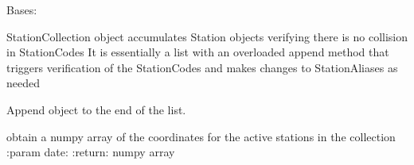 \documentclass[letterpaper,10pt,english]{sphinxmanual}
\begin{document}

\begin{fulllineitems}
\label{\detokenize{parallel_gamit:parallel_gamit.pyStation.StationCollection}}
\pysigstartsignatures
{}
\pysigstopsignatures
\sphinxAtStartPar
Bases: 

\sphinxAtStartPar
StationCollection object accumulates Station objects verifying there is no collision in StationCodes
It is essentially a list with an overloaded append method that triggers verification of the StationCodes and
makes changes to StationAliases as needed

\begin{fulllineitems}
\label{\detokenize{parallel_gamit:parallel_gamit.pyStation.StationCollection.append}}
\pysigstartsignatures
{}
\pysigstopsignatures
\sphinxAtStartPar
Append object to the end of the list.

\end{fulllineitems}


\begin{fulllineitems}
\label{\detokenize{parallel_gamit:parallel_gamit.pyStation.StationCollection.compare_aliases}}
\pysigstartsignatures
{}
\pysigstopsignatures
\end{fulllineitems}


\begin{fulllineitems}
\label{\detokenize{parallel_gamit:parallel_gamit.pyStation.StationCollection.get_active_coordinates}}
\pysigstartsignatures
{}
\pysigstopsignatures
\sphinxAtStartPar
obtain a numpy array of the coordinates for the active stations in the collection
:param date:
:return: numpy array


\end{fulllineitems}
\end{fulllineitems}
\end{document}

